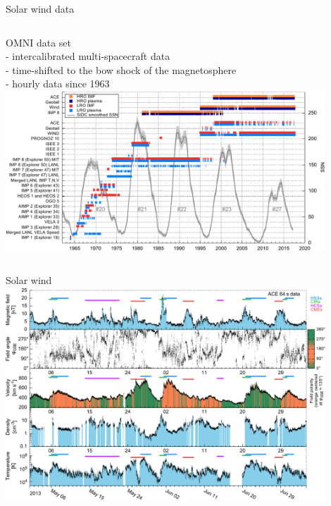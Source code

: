 \begin{frame}[plain,c]{Solar wind data}{}
	\begin{columns}[c]
	\column{\textwidth}
		
		OMNI data set \citep{King2005}\\
		- intercalibrated multi-spacecraft data\\
		- time-shifted to the bow shock of the magnetosphere\\
		- hourly data since 1963\\
		\centering
		\includegraphics[width=0.9\textwidth]{../figures_of_mine/gnuplots/timeline_OMNI_SC_IDs.pdf}
		
		
	\end{columns}
\end{frame}
\begin{frame}[plain,c]{Solar wind}{}
	\centering
	\includegraphics[width=0.9\textwidth]{../figures_of_mine/gnuplots/ACE_64s_v7_thesis_CIRs_2013-5-1_65_plot.pdf}
	
\end{frame}
